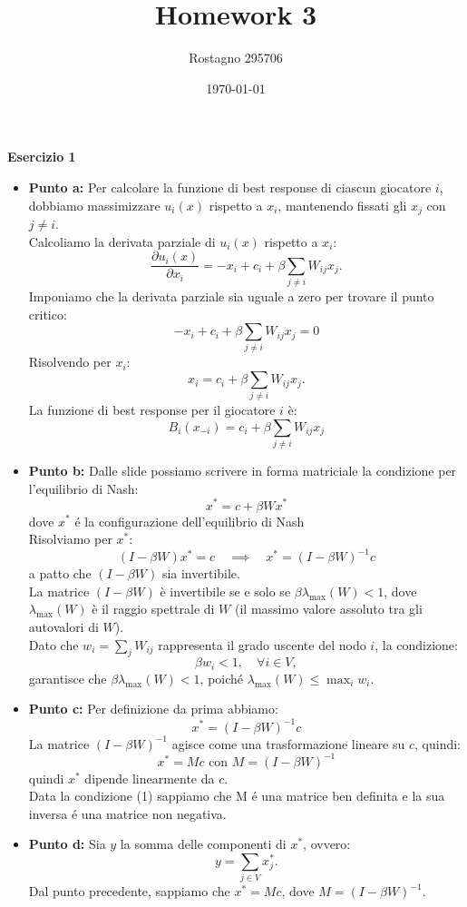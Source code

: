 \documentclass[a4paper,12pt]{article}
\begin{document}
	\title{\textbf{Homework 3}}
	\author{Rostagno 295706}
	\date{\today}
	\maketitle
	
	\centering \textbf{Esercizio 1}\\
	\begin{itemize}
		\item \textbf{Punto a: }
		Per calcolare la funzione di best response di ciascun giocatore \( i \), dobbiamo massimizzare \( u_i(x) \) rispetto a \( x_i \), mantenendo fissati gli \( x_j \) con \( j \neq i \).\\
		Calcoliamo la derivata parziale di \( u_i(x) \) rispetto a \( x_i \):
		\[
		\frac{\partial u_i(x)}{\partial x_i} = -x_i + c_i + \beta \sum_{j \neq i} W_{ij} x_j.
		\]
		Imponiamo che la derivata parziale sia uguale a zero per trovare il punto critico:
		\[
		-x_i + c_i + \beta \sum_{j \neq i} W_{ij} x_j = 0
		\]
		Risolvendo per \( x_i \):
		\[
		x_i = c_i + \beta \sum_{j \neq i} W_{ij} x_j.
		\]
		La funzione di best response per il giocatore \( i \) è:
		\[
		B_i(x_{-i}) = c_i + \beta \sum_{j \neq i} W_{ij} x_j
		\]
		\item \textbf{Punto b: } 
		Dalle slide possiamo scrivere in forma matriciale la condizione per l'equilibrio di Nash:\\
		\[
		x^* = c + \beta W x^*
		\]
		dove $x^*$ é la configurazione dell'equilibrio di Nash\\
		Risolviamo per \( x^* \):
		\[
		(I - \beta W)x^* = c \quad \implies \quad x^* = (I - \beta W)^{-1}c
		\]
		a patto che \( (I - \beta W) \) sia invertibile.\\
		La matrice \( (I - \beta W) \) è invertibile se e solo se \( \beta \lambda_{\text{max}}(W) < 1 \), dove \( \lambda_{\text{max}}(W) \) è il raggio spettrale di \( W \) (il massimo valore assoluto tra gli autovalori di \( W \)).\\
		Dato che \( w_i = \sum_j W_{ij} \) rappresenta il grado uscente del nodo \( i \), la condizione:
		\[
		\beta w_i < 1, \quad \forall i \in V,
		\]
		garantisce che \( \beta \lambda_{\text{max}}(W) < 1 \), poiché \( \lambda_{\text{max}}(W) \leq \max_i w_i \).
		\item \textbf{Punto c: }
		Per definizione da prima abbiamo:\\
		\[
		x^* = (I - \beta W)^{-1}c
		\]
		La matrice $(I - \beta W)^{-1}$ agisce come una trasformazione lineare su $c$, quindi:\\
		\[
		x^*=Mc \text{ con }M=(I - \beta W)^{-1}
		\]
		quindi $x^*$ dipende linearmente da $c$.\\
		Data la condizione (1) sappiamo che M é una matrice ben definita e la sua inversa é una matrice non negativa. 
		\item \textbf{Punto d: }
		Sia \( y \) la somma delle componenti di \( x^* \), ovvero:
		$$
		y = \sum_{j \in V} x_j^*.
		$$
		Dal punto precedente, sappiamo che \( x^* = Mc \), dove \( M = (I - \beta W)^{-1} \).
		

\end{itemize}
\end{document}
